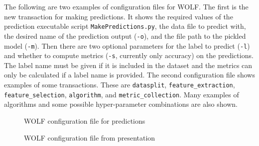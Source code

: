 The following are two examples of configuration files for WOLF. The first is the new transaction for making predictions. It shows the required values of the prediction executable script {\tt MakePredictions.py}, the data file to predict with, the desired name of the prediction output ({\tt -o}), and the file path to the pickled model ({\tt -m}). Then there are two optional parameters for the label to predict ({\tt -l}) and whether to compute metrics ({\tt -s}, currently only accuracy) on the predictions. The label name must be given if it is included in the dataset and the metrics can only be calculated if a label name is provided. The second configuration file shows examples of some transactions. These are {\tt datasplit}, {\tt feature\_extraction}, {\tt feature\_selection}, {\tt algorithm}, and {\tt metric\_collection}. Many examples of algorithms and some possible hyper-parameter combinations are also shown.

\begin{figure}[h]
	\centering
	
	\caption{WOLF configuration file for predictions}
	\label{fig:wolf predict}
\end{figure}

\begin{figure}[h]
	\centering
	
	\caption{WOLF configuration file from presentation}
	\label{fig:wolf presentation}
\end{figure}